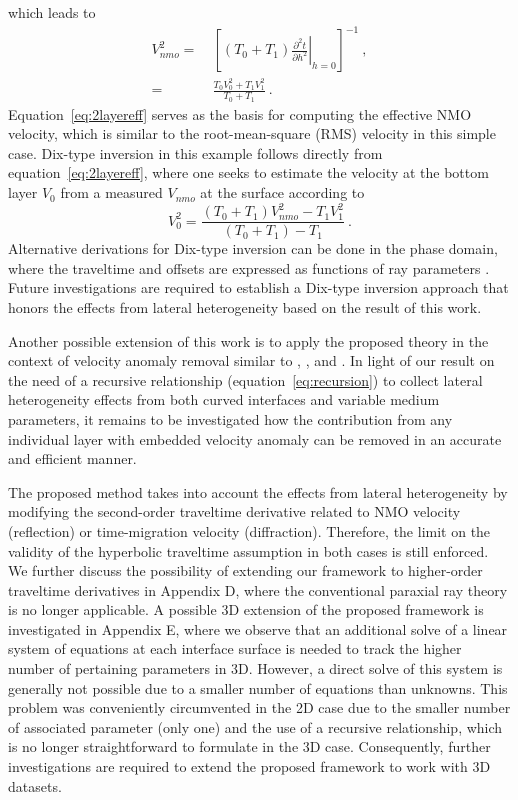 which leads to
\begin{align}
\nonumber
    V^2_{nmo} =&~\left[ (T_0+T_1) \left.\frac{\partial^2 t}{\partial h^2 }\right\rvert_{h=0} \right]^{-1}~, \\
\label{eq:2layereff}
    =&~\frac{T_0V^2_0 + T_1V^2_1}{T_0+T_1}~.
\end{align}
Equation~\ref{eq:2layereff} serves as the basis for computing the effective NMO velocity, which is similar to the root-mean-square (RMS) velocity in this simple case. Dix-type inversion in this example follows directly from equation~\ref{eq:2layereff}, where one seeks to estimate the velocity at the bottom layer $V_0$ from a measured $V_{nmo}$ at the surface according to
\begin{equation}
    V^2_0 = \frac{(T_0+T_1)V^2_{nmo} - T_1 V^2_1}{(T_0+T_1) - T_1}~.
\end{equation}
Alternative derivations for Dix-type inversion can be done in the phase domain, where the traveltime and offsets are expressed as functions of ray parameters \cite[]{tsvankinbook,zoneinterval,korenravvetriclinic}.
Future investigations are required to establish a Dix-type inversion approach that honors the effects from lateral heterogeneity based on the result of this work.

Another possible extension of this work is to apply the proposed theory in the context of velocity anomaly removal similar to \cite{blias2009}, \cite{takanashitsvankin11}, and \cite{takanashitsvankin12}. In light of our result on the need of a recursive relationship (equation~\ref{eq:recursion}) to collect lateral heterogeneity effects from both curved interfaces and variable medium parameters, it remains to be investigated how the contribution from any individual layer with embedded velocity anomaly can be removed in an accurate and efficient manner.

The proposed method takes into account the effects from lateral heterogeneity by modifying the second-order traveltime derivative related to NMO velocity (reflection) or time-migration velocity (diffraction). Therefore, the limit on the validity of the hyperbolic traveltime assumption in both cases is still enforced. We further discuss the possibility of extending our framework to higher-order traveltime derivatives in Appendix D, where the conventional paraxial ray theory is no longer applicable. A possible 3D extension of the proposed framework is investigated in Appendix E, where we observe that an additional solve of a linear system of equations at each interface surface is needed to track the higher number of pertaining parameters in 3D. However, a direct solve of this system is generally not possible due to a smaller number of equations than unknowns. This problem was conveniently circumvented in the 2D case due to the smaller number of associated parameter (only one) and the use of a recursive relationship, which is no longer straightforward to formulate in the 3D case. Consequently, further investigations are required to extend the proposed framework to work with 3D datasets.

